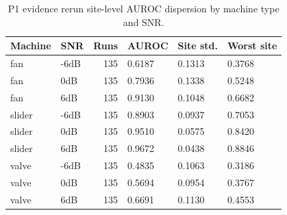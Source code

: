 \begin{table}[t]
\centering
\scriptsize
\setlength{\tabcolsep}{3pt}
\caption{P1 evidence rerun site-level AUROC dispersion by machine type and SNR.}
\label{tab:p1-evidence-site-dispersion}
\begin{tabular}{llrlll}
\toprule
Machine & SNR & Runs & AUROC & Site std. & Worst site \\
\midrule
fan & -6dB & 135 & 0.6187 & 0.1313 & 0.3768 \\
fan & 0dB & 135 & 0.7936 & 0.1338 & 0.5248 \\
fan & 6dB & 135 & 0.9130 & 0.1048 & 0.6682 \\
slider & -6dB & 135 & 0.8903 & 0.0937 & 0.7053 \\
slider & 0dB & 135 & 0.9510 & 0.0575 & 0.8420 \\
slider & 6dB & 135 & 0.9672 & 0.0438 & 0.8846 \\
valve & -6dB & 135 & 0.4835 & 0.1063 & 0.3186 \\
valve & 0dB & 135 & 0.5694 & 0.0954 & 0.3767 \\
valve & 6dB & 135 & 0.6691 & 0.1130 & 0.4553 \\
\bottomrule
\end{tabular}
\end{table}
